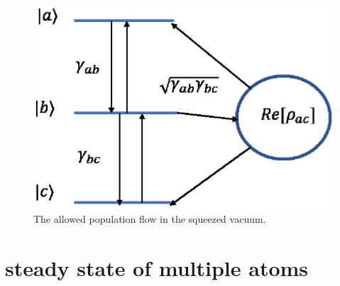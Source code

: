 \documentclass[aps,showpacs,twocolumn,twoside,groupedaddress]{revtex4}
\begin{document}
\begin{figure}
\includegraphics[width=0.8\columnwidth]{atom_fig3.eps}
\caption{ The allowed population flow in the squeezed vacuum.}
\label{2c}
\end{figure}

\section{steady state of multiple atoms}
\end{document}
